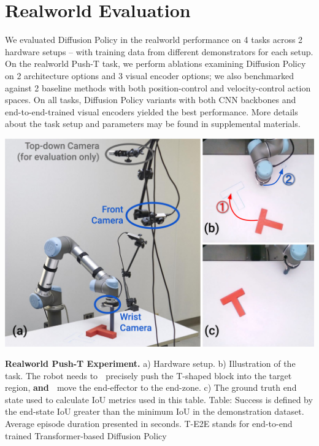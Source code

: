 \section{Realworld Evaluation}
We evaluated Diffusion Policy in the realworld performance on 4 tasks across 2 hardware setups -- with training data from different demonstrators for each setup. On the realworld Push-T task, we perform ablations examining Diffusion Policy on 2 architecture options and 3 visual encoder options; we also benchmarked against 2 baseline methods with both position-control and velocity-control action spaces. On all tasks, Diffusion Policy variants with both CNN backbones and end-to-end-trained visual encoders yielded the best performance. More details about the task setup and parameters may be found in supplemental materials.

\begin{table}[t]
\centering
\includegraphics[width=0.9\linewidth]{figure/real_task_setup.pdf}

\vspace{2mm}


\caption{\textbf{Realworld Push-T Experiment.}
\label{tab:real_pusht}
a) Hardware setup.
b) Illustration of the task. The robot needs to \textcircled{} precisely push the T-shaped block into the target region, \textbf{and} \textcircled{} move the end-effector to the end-zone.
c) The ground truth end state used to calculate IoU metrics used in this table. Table: Success is defined by the end-state IoU greater than the minimum IoU in the demonstration dataset. Average episode duration presented in seconds. T-E2E stands for end-to-end trained Transformer-based Diffusion Policy}

\vspace{-4mm}
\end{table}

